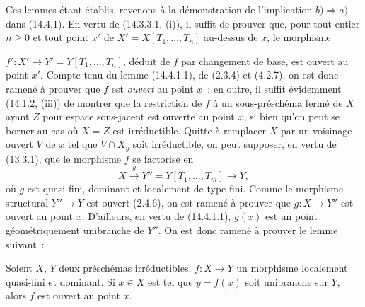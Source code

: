 Ces lemmes étant établis, revenons à la démonstration de l'implication $b)\Rightarrow
a)$ dans (14.4.1). En vertu de (14.3.3.1, (i)), il suffit de prouver que, pour tout
entier $n\geq 0$ et tout point $x'$ de $X'=X[T_1,\ldots,T_n]$ au-dessus de $x$, le
morphisme


$f':X'\to Y'=Y[T_1,\ldots,T_n]$, déduit de $f$ par changement de base, est ouvert
au point $x'$. Compte tenu du lemme (14.4.1.1), de (2.3.4) et (4.2.7), on est donc
ramené à prouver que $f$ est \emph{ouvert} au point $x$~: en outre, il suffit
évidemment (14.1.2, (iii)) de montrer que la restriction de $f$ à un
sous-préschéma fermé de $X$ ayant $Z$ pour espace sous-jacent est ouverte au point
$x$, si bien qu'on peut se borner au cas où $X=Z$ est irréductible. Quitte à
remplacer $X$ par un voisinage ouvert $V$ de $x$ tel que $V\cap X_y$ soit
irréductible, on peut supposer, en vertu de (13.3.1), que le morphisme $f$ se
factorise en
\[
  X\xrightarrow{g}Y''=Y[T_1,\ldots,T_m]\to Y,
\]
où $g$ est quasi-fini, dominant et localement de type fini. Comme le morphisme
structural $Y''\to Y$ est ouvert (2.4.6), on est ramené à prouver que $g:X\to Y''$
est ouvert au point $x$. D'ailleurs, en vertu de (14.4.1.1), $g(x)$ est un point
géométriquement unibranche de $Y''$. On est donc ramené à prouver le lemme suivant~:

\begin{lemma}[14.4.1.3]
\label{IV.14.4.1.3-fr}
Soient $X$, $Y$ deux préschémas irréductibles, $f:X\to Y$ un morphisme localement
quasi-fini et dominant. Si $x\in X$ est tel que $y=f(x)$ soit unibranche sur $Y$,
alors $f$ est ouvert au point $x$.
\end{lemma}

